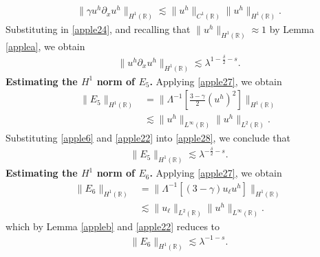\documentclass[12pt,reqno]{amsart}
\newcommand{\rr}{\mathbb{R}}
\newcommand{\p}{\partial}
\theoremstyle{plain}  %
\theoremstyle{definition}
\begin{document}
\begin{equation}
	\begin{split}
		\|\gamma u^h \p_x u^h\|_{H^1(\rr)} \lesssim \|u^h\|_{C^1(\rr)}
		\|u^h\|_{H^1(\rr)}.
		\label{apple25}
	\end{split}
\end{equation}
Substituting in \eqref{apple24}, and recalling that $\|u^h\|_{H^1(\rr)} \approx 1$ by Lemma
\ref{applea}, we obtain
\begin{equation}
	\begin{split}
		\|u^h \p_x u^h \|_{H^1(\rr)} \lesssim \lambda^{1-\frac{\delta}{2}-s}.
		\label{apple26}
	\end{split}
\end{equation}
\vskip0.1in
%
%
{\bf Estimating the $H^1$ norm of $\hyperref[all_errors_together]{E_5}$.}
Applying \eqref{apple27}, we obtain
\begin{equation}
	\begin{split}
		\|E_5\|_{H^1(\rr)}
		& = \|\Lambda^{-1}\left[ \frac{3-\gamma}{2}(u^h)^2
		\right]\|_{H^1(\rr)}
		\\
		& \lesssim \|u^h\|_{L^\infty(\rr)} \|u^h\|_{L^2(\rr)}.
		\label{apple28}
	\end{split}
\end{equation}
Substituting \eqref{apple6} and \eqref{apple22} into \eqref{apple28}, we conclude that
\begin{equation}
	\begin{split}
		\|E_5\|_{H^1(\rr)} \lesssim \lambda^{-\frac{\delta}{2}-s}.
		\label{apple29}
	\end{split}
\end{equation}
%
%
\vskip0.1in
%
%
{\bf Estimating the $H^1$ norm of $\hyperref[all_errors_together]{E_6}$.} Applying \eqref{apple27}, we obtain
\begin{equation}
	\begin{split}
		\|E_6\|_{H^1(\rr)} 
		& = \|\Lambda^{-1} \left[ (3 -\gamma) u_\ell u^h \right]\|_{H^1(\rr)}
		\\
		& \lesssim \|u_\ell\|_{L^2(\rr)} \|u^h\|_{L^\infty(\rr)}.
		\label{apple30}
	\end{split}
\end{equation}
which by Lemma \ref{appleb} and \eqref{apple22} reduces to
\begin{equation}
	\begin{split}
		\|E_6\|_{H^1(\rr)} \lesssim \lambda^{-1-s}.
		\label{apple31}
	\end{split}
\end{equation}
\end{document}
